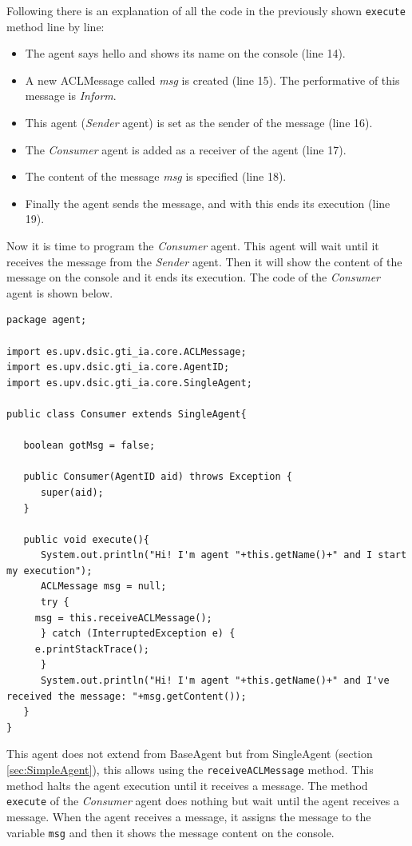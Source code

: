 Following there is an explanation of all the code in the previously shown \texttt{execute} method line by line:
\begin{itemize}
   \item The agent says hello and shows its name on the console (line 14).
   \item A new ACLMessage called \textit{msg} is created (line 15). The performative of this message is \textit{Inform}.
   \item This agent (\textit{Sender} agent) is set as the sender of the message (line 16).
   \item The  \textit{Consumer} agent is added as a receiver of the agent (line 17). 
   \item The content of the message \textit{msg} is specified (line 18).
   \item Finally the agent sends the message, and with this ends its execution (line 19).
\end{itemize}
Now it is time to program the \textit{Consumer} agent. This agent will wait until it receives the message from the \textit{Sender} agent. Then it will show the content of the message on the console and it ends its execution. The code of the \textit{Consumer} agent is shown below.
\begin{lstlisting}[style=Java]
package agent;

import es.upv.dsic.gti_ia.core.ACLMessage;
import es.upv.dsic.gti_ia.core.AgentID;
import es.upv.dsic.gti_ia.core.SingleAgent;

public class Consumer extends SingleAgent{

   boolean gotMsg = false;

   public Consumer(AgentID aid) throws Exception {
      super(aid);
   }

   public void execute(){
      System.out.println("Hi! I'm agent "+this.getName()+" and I start my execution");
      ACLMessage msg = null;
      try {
	 msg = this.receiveACLMessage();
      } catch (InterruptedException e) {
	 e.printStackTrace();
      }
      System.out.println("Hi! I'm agent "+this.getName()+" and I've received the message: "+msg.getContent());
   }
}
\end{lstlisting}
This agent does not extend from BaseAgent but from SingleAgent (section \ref{sec:SimpleAgent}), this allows using the  \texttt{receiveACLMessage} method. This method halts the agent execution until it receives a message. The method \texttt{execute} of the \textit{Consumer} agent does nothing but wait until the agent receives a message. When the agent receives a message, it assigns the message to the variable \texttt{msg} and then it shows the message content on the console.

